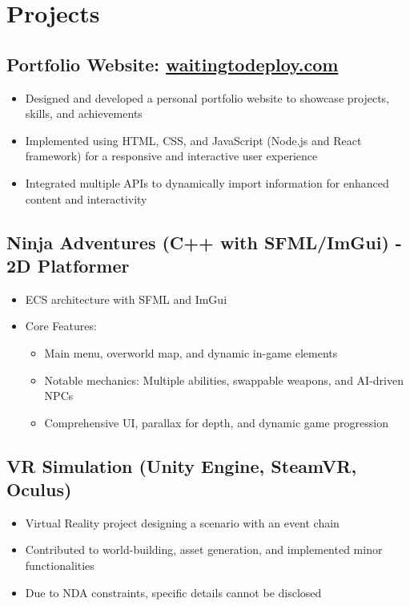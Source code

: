 \documentclass[10pt]{article}
\begin{document}
\section{Projects}
\subsection{Portfolio Website: \href{http://waitingtodeploy.com}{waitingtodeploy.com} \hfill }
\begin{itemize}
    \item Designed and developed a personal portfolio website to showcase projects, skills, and achievements
    \item Implemented using HTML, CSS, and JavaScript (Node.js and React framework) for a responsive and interactive user experience
    \item Integrated multiple APIs to dynamically import information for enhanced content and interactivity
\end{itemize}

\subsection{Ninja Adventures (C++ with SFML/ImGui) - 2D Platformer \hfill }
\begin{itemize}
    \item ECS architecture with SFML and ImGui
    \item Core Features:
    \begin{itemize}
        \item Main menu, overworld map, and dynamic in-game elements
        \item Notable mechanics: Multiple abilities, swappable weapons, and AI-driven NPCs
        \item Comprehensive UI, parallax for depth, and dynamic game progression
    \end{itemize}
\end{itemize}

\subsection{VR Simulation (Unity Engine, SteamVR, Oculus) \hfill }
\begin{itemize}
    \item Virtual Reality project designing a scenario with an event chain
    \item Contributed to world-building, asset generation, and implemented minor functionalities
    \item Due to NDA constraints, specific details cannot be disclosed
\end{itemize}
\end{document}
